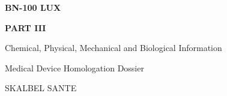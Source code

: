 \documentclass[12pt,a4paper]{report}
\begin{document}

\begin{titlepage}
    \centering

    \vspace*{3cm}

    {\Huge\bfseries BN-100 LUX\par}

    \vspace{1cm}

    {\LARGE\bfseries PART III\par}

    \vspace{0.5cm}

    {\Large Chemical, Physical, Mechanical and Biological Information\par}

    \vfill

    {\large Medical Device Homologation Dossier\par}

    \vspace{0.5cm}

    {\large SKALBEL SANTE\par}

    \vspace{2cm}
\end{titlepage}


\setcounter{tocdepth}{2}

\tableofcontents
\clearpage




\setcounter{chapter}{3}
\setcounter{section}{0}







\end{document}
